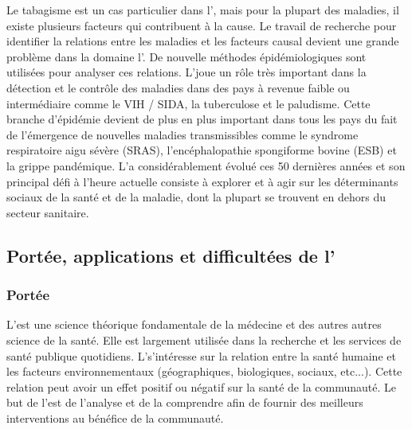 Le tabagisme est un cas particulier dans l'\ep, mais pour la plupart des maladies, il existe plusieurs facteurs qui contribuent à la cause. Le travail de recherche pour identifier la relations entre les maladies et les facteurs causal devient une grande problème dans la domaine l'\ep. De nouvelle méthodes épidémiologiques sont utilisées pour analyser ces relations. L'\ep joue un rôle très important dans la détection et le contrôle des maladies dans des pays à revenue faible ou intermédiaire comme le VIH / SIDA, la tuberculose et le paludisme. Cette branche d'épidémie devient de plus en plus important dans tous les pays du fait de l'émergence de nouvelles maladies transmissibles comme le syndrome respiratoire aigu sévère (SRAS), l’encéphalopathie spongiforme bovine (ESB) et la grippe pandémique. L'\ep a considérablement évolué ces 50 dernières années et son principal défi à l’heure actuelle consiste à explorer et à agir sur les déterminants sociaux de la santé et de la maladie, dont la plupart se trouvent en dehors du secteur sanitaire.

\subsection{Portée, applications et difficultées de l'\ep }
\subsubsection{Portée}

L'\ep est une science théorique fondamentale de la médecine et des autres autres science de la santé. Elle est largement utilisée dans la recherche et les services de santé publique quotidiens. L'\ep s'intéresse sur la relation entre la santé humaine et les facteurs environnementaux (géographiques, biologiques, sociaux, etc...). Cette relation peut avoir un effet positif ou négatif sur la santé de la communauté. Le but de l'\ep est de l'analyse et de la comprendre afin de fournir des meilleurs interventions au bénéfice de la communauté.

